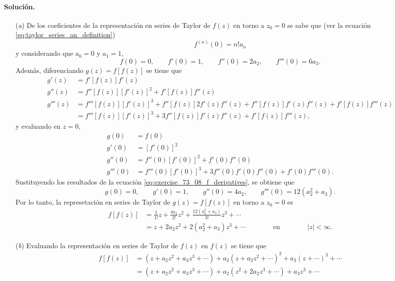 \documentclass[a4paper]{report}
\begin{document}
\paragraph{Solución.} 
\begin{enumerate}
 \item[(\textit{a})] De los coeficientes de la representación en series de Taylor de \(f(z)\) en torno a \(z_0=0\) se sabe que (ver la ecuación \ref{eq:taylor_series_an_definition})
\[
 f^{(n)}(0)=n!a_n 
\]
y considerando que \(a_0=0\) y \(a_1=1\),
\begin{equation}\label{eq:exercise_73_08_f_derivatives}
 f(0)=0,\qquad 
 f'(0)=1,\qquad
 f''(0)=2a_2,\qquad 
 f'''(0)=6a_3. 
\end{equation}
Además, diferenciando \(g(z)=f[f(z)]\) se tiene que 
\begin{align*}
 g'(z)&=f'[f(z)]f'(z)\\
 g''(z)&=f''[f(z)][f'(z)]^2+f'[f(z)]f''(z)\\
 g'''(z)&=f'''[f(z)][f'(z)]^3+f''[f(z)]2f'(z)f''(z)+f''[f(z)]f'(z)f''(z)+f'[f(z)]f'''(z)\\
   &=f'''[f(z)][f'(z)]^3+3f''[f(z)]f'(z)f''(z)+f'[f(z)]f'''(z),
\end{align*}
y evaluando en \(z=0\),
\begin{align*}
 g(0)&=f(0)\\ 
 g'(0)&=[f'(0)]^2\\
 g''(0)&=f''(0)[f'(0)]^2+f'(0)f''(0)\\ 
 g'''(0)&=f'''(0)[f'(0)]^3+3f''(0)f'(0)f''(0)+f'(0)f'''(0). 
\end{align*}
Sustituyendo los resultados de la ecuación \ref{eq:exercise_73_08_f_derivatives}, se obtiene que
\[
 g(0)=0,\qquad
 g'(0)=1,\qquad
 g''(0)=4a_2,\qquad
 g'''(0)=12(a_2^2+a_3).
\]
Por lo tanto, la represetación en series de Taylor de \(g(z)=f[f(z)]\) en torno a \(z_0=0\) es
\begin{align*}
 f[f(z)]&=\frac{1}{1!}z+\frac{4a_2}{2!}z^2+\frac{12(a_2^2+a_3)}{3!}z^3+\cdots\\
   &=z+2a_2z^2+2(a_2^2+a_3)z^3+\cdots
  \qquad\qquad\textrm{en}\qquad\qquad
  |z|<\infty.
\end{align*}
 \item[(\textit{b})] Evaluando la representación en series de Taylor de \(f(z)\) en \(f(z)\) se tiene que 
 \begin{align*}
  f[f(z)]&=(z+a_2z^2+a_3z^3+\cdots)+a_2(z+a_2z^2+\cdots)^2+a_3(z+\cdots)^3+\cdots\\
    &=(z+a_2z^2+a_3z^3+\cdots)+a_2(z^2+2a_2z^3+\cdots)+a_3z^3+\cdots\\

\end{align*}
\end{enumerate}
\end{document}
